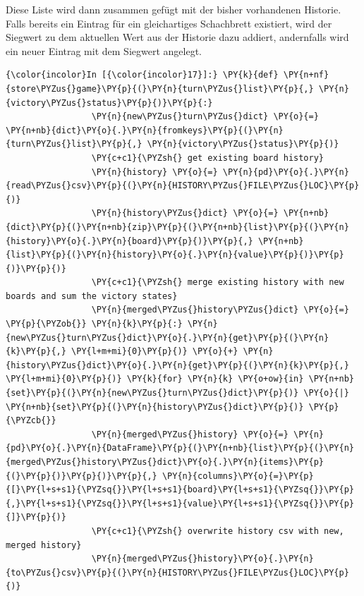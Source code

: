 Diese Liste wird dann zusammen gefügt mit der bisher vorhandenen
Historie. Falls bereits ein Eintrag für ein gleichartiges Schachbrett
existiert, wird der Siegwert zu dem aktuellen Wert aus der Historie dazu
addiert, andernfalls wird ein neuer Eintrag mit dem Siegwert angelegt.

    \begin{Verbatim}[commandchars=\\\{\}]
{\color{incolor}In [{\color{incolor}17}]:} \PY{k}{def} \PY{n+nf}{store\PYZus{}game}\PY{p}{(}\PY{n}{turn\PYZus{}list}\PY{p}{,} \PY{n}{victory\PYZus{}status}\PY{p}{)}\PY{p}{:}
                 \PY{n}{new\PYZus{}turn\PYZus{}dict} \PY{o}{=} \PY{n+nb}{dict}\PY{o}{.}\PY{n}{fromkeys}\PY{p}{(}\PY{n}{turn\PYZus{}list}\PY{p}{,} \PY{n}{victory\PYZus{}status}\PY{p}{)}
                 \PY{c+c1}{\PYZsh{} get existing board history}
                 \PY{n}{history} \PY{o}{=} \PY{n}{pd}\PY{o}{.}\PY{n}{read\PYZus{}csv}\PY{p}{(}\PY{n}{HISTORY\PYZus{}FILE\PYZus{}LOC}\PY{p}{)}
                 \PY{n}{history\PYZus{}dict} \PY{o}{=} \PY{n+nb}{dict}\PY{p}{(}\PY{n+nb}{zip}\PY{p}{(}\PY{n+nb}{list}\PY{p}{(}\PY{n}{history}\PY{o}{.}\PY{n}{board}\PY{p}{)}\PY{p}{,} \PY{n+nb}{list}\PY{p}{(}\PY{n}{history}\PY{o}{.}\PY{n}{value}\PY{p}{)}\PY{p}{)}\PY{p}{)}
                 \PY{c+c1}{\PYZsh{} merge existing history with new boards and sum the victory states}
                 \PY{n}{merged\PYZus{}history\PYZus{}dict} \PY{o}{=} \PY{p}{\PYZob{}} \PY{n}{k}\PY{p}{:} \PY{n}{new\PYZus{}turn\PYZus{}dict}\PY{o}{.}\PY{n}{get}\PY{p}{(}\PY{n}{k}\PY{p}{,} \PY{l+m+mi}{0}\PY{p}{)} \PY{o}{+} \PY{n}{history\PYZus{}dict}\PY{o}{.}\PY{n}{get}\PY{p}{(}\PY{n}{k}\PY{p}{,} \PY{l+m+mi}{0}\PY{p}{)} \PY{k}{for} \PY{n}{k} \PY{o+ow}{in} \PY{n+nb}{set}\PY{p}{(}\PY{n}{new\PYZus{}turn\PYZus{}dict}\PY{p}{)} \PY{o}{|} \PY{n+nb}{set}\PY{p}{(}\PY{n}{history\PYZus{}dict}\PY{p}{)} \PY{p}{\PYZcb{}}
                 \PY{n}{merged\PYZus{}history} \PY{o}{=} \PY{n}{pd}\PY{o}{.}\PY{n}{DataFrame}\PY{p}{(}\PY{n+nb}{list}\PY{p}{(}\PY{n}{merged\PYZus{}history\PYZus{}dict}\PY{o}{.}\PY{n}{items}\PY{p}{(}\PY{p}{)}\PY{p}{)}\PY{p}{,} \PY{n}{columns}\PY{o}{=}\PY{p}{[}\PY{l+s+s1}{\PYZsq{}}\PY{l+s+s1}{board}\PY{l+s+s1}{\PYZsq{}}\PY{p}{,}\PY{l+s+s1}{\PYZsq{}}\PY{l+s+s1}{value}\PY{l+s+s1}{\PYZsq{}}\PY{p}{]}\PY{p}{)}
                 \PY{c+c1}{\PYZsh{} overwrite history csv with new, merged history}
                 \PY{n}{merged\PYZus{}history}\PY{o}{.}\PY{n}{to\PYZus{}csv}\PY{p}{(}\PY{n}{HISTORY\PYZus{}FILE\PYZus{}LOC}\PY{p}{)}
\end{Verbatim}


